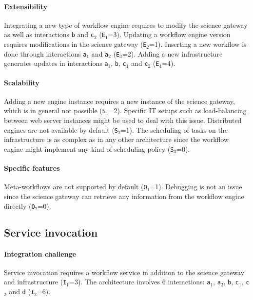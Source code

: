 \documentclass[preprint,3p,twocolumn]{elsarticle}
\newcommand{\closedanswerednote}[6]{}
\begin{document}
\paragraph{Extensibility} Integrating a new type of workflow engine
requires to modify the science gateway as well as interactions
\texttt{b} and \texttt{c$_2$} (\texttt{E$_1$}=3). Updating a workflow
engine version requires modifications in the science gateway
(\texttt{E$_2$}=1).  Inserting a new workflow is done through
interactions \texttt{a$_1$} and \texttt{a$_2$}
(\texttt{E$_3$}=2). Adding a new infrastructure generates updates in
interactions \texttt{a$_1$}, \texttt{b}, \texttt{c$_1$} and
\texttt{c$_2$} (\texttt{E$_4$}=4).

\paragraph{Scalability} Adding a new engine instance requires a new
instance of the science gateway, which is in general not possible
(\texttt{S$_1$}=2). Specific IT setups such as load-balancing between
web server instances might be used to deal with this
issue. \closedanswerednote{Tristan}{What-about load-balancing between web
  server instances?}{Marc-e}{Would that really be considered a real
  architectural feature or an IT hack?}{Tristan}{I agree, we should
  keep IT setups out of the picture. Depending on the internals of the
  science gateway, such hacks may or may not be feasible. I added a
  sentence to mention this possibility, without changing the score.}
Distributed engines are not available by default
(\texttt{S$_2$}=1). The scheduling of tasks on the infrastructure is
as complex as in any other architecture since the workflow engine
might implement any kind of scheduling policy (\texttt{S$_3$}=0).

\paragraph{Specific features} Meta-workflows are not supported by default
(\texttt{O$_1$}=1).  Debugging is not an issue since the science
gateway can retrieve any information from the workflow engine directly
(\texttt{O$_2$}=0).

\subsection{Service invocation}

\paragraph{Integration challenge} Service invocation requires a workflow service
in addition to the science gateway and infrastructure
(\texttt{I$_1$}=3). The architecture involves 6 interactions:
\texttt{a$_1$}, \texttt{a$_2$}, \texttt{b}, \texttt{c$_1$},
\texttt{c$_2$} and \texttt{d} (\texttt{I$_2$}=6).
\end{document}
